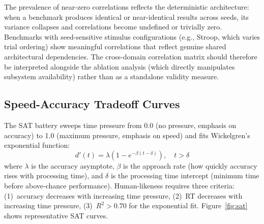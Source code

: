 \documentclass[11pt,letterpaper]{article}
\begin{document}
The prevalence of near-zero correlations reflects the deterministic architecture: when a benchmark produces identical or near-identical results across seeds, its variance collapses and correlations become undefined or trivially zero. Benchmarks with seed-sensitive stimulus configurations (e.g., Stroop, which varies trial ordering) show meaningful correlations that reflect genuine shared architectural dependencies. The cross-domain correlation matrix should therefore be interpreted alongside the ablation analysis (which directly manipulates subsystem availability) rather than as a standalone validity measure.

\subsection{Speed-Accuracy Tradeoff Curves}

The SAT battery sweeps time pressure from 0.0 (no pressure, emphasis on accuracy) to 1.0 (maximum pressure, emphasis on speed) and fits Wickelgren's~\citep{wickelgren1977speed} exponential function:
\begin{equation}
d'(t) = \lambda \left(1 - e^{-\beta(t - \delta)}\right), \quad t > \delta
\label{eq:sat}
\end{equation}
where $\lambda$ is the accuracy asymptote, $\beta$ is the approach rate (how quickly accuracy rises with processing time), and $\delta$ is the processing time intercept (minimum time before above-chance performance). Human-likeness requires three criteria: (1)~accuracy decreases with increasing time pressure, (2)~RT decreases with increasing time pressure, (3)~$R^2 > 0.70$ for the exponential fit. Figure~\ref{fig:sat} shows representative SAT curves.
\end{document}
